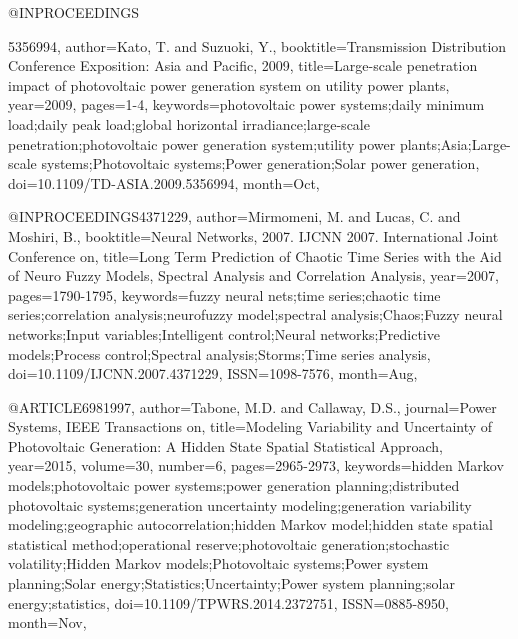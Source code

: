 @INPROCEEDINGS{5356994, 
author={Kato, T. and Suzuoki, Y.}, 
booktitle={Transmission Distribution Conference Exposition: Asia and Pacific, 2009}, 
title={Large-scale penetration impact of photovoltaic power generation system on utility power plants}, 
year={2009}, 
pages={1-4}, 
keywords={photovoltaic power systems;daily minimum load;daily peak load;global horizontal irradiance;large-scale penetration;photovoltaic power generation system;utility power plants;Asia;Large-scale systems;Photovoltaic systems;Power generation;Solar power generation}, 
doi={10.1109/TD-ASIA.2009.5356994}, 
month={Oct},

@INPROCEEDINGS{4371229, 
author={Mirmomeni, M. and Lucas, C. and Moshiri, B.}, 
booktitle={Neural Networks, 2007. IJCNN 2007. International Joint Conference on}, 
title={Long Term Prediction of Chaotic Time Series with the Aid of Neuro Fuzzy Models, Spectral Analysis and Correlation Analysis}, 
year={2007}, 
pages={1790-1795}, 
keywords={fuzzy neural nets;time series;chaotic time series;correlation analysis;neurofuzzy model;spectral analysis;Chaos;Fuzzy neural networks;Input variables;Intelligent control;Neural networks;Predictive models;Process control;Spectral analysis;Storms;Time series analysis}, 
doi={10.1109/IJCNN.2007.4371229}, 
ISSN={1098-7576}, 
month={Aug},}

@ARTICLE{6981997, 
author={Tabone, M.D. and Callaway, D.S.}, 
journal={Power Systems, IEEE Transactions on}, 
title={Modeling Variability and Uncertainty of Photovoltaic Generation: A Hidden State Spatial Statistical Approach}, 
year={2015}, 
volume={30}, 
number={6}, 
pages={2965-2973}, 
keywords={hidden Markov models;photovoltaic power systems;power generation planning;distributed photovoltaic systems;generation uncertainty modeling;generation variability modeling;geographic autocorrelation;hidden Markov model;hidden state spatial statistical method;operational reserve;photovoltaic generation;stochastic volatility;Hidden Markov models;Photovoltaic systems;Power system planning;Solar energy;Statistics;Uncertainty;Power system planning;solar energy;statistics}, 
doi={10.1109/TPWRS.2014.2372751}, 
ISSN={0885-8950}, 
month={Nov},}

}

